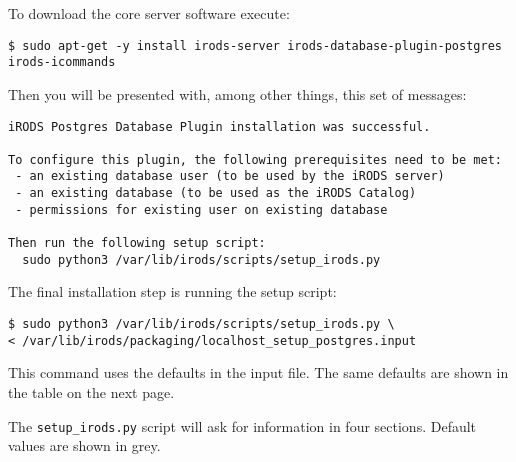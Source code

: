 \documentclass[10pt,oneside]{memoir}
\begin{document}
To download the core server software execute:

\begin{lstlisting}
$ sudo apt-get -y install irods-server irods-database-plugin-postgres irods-icommands
\end{lstlisting}

Then you will be presented with, among other things, this set of messages:

\begin{lstlisting}
iRODS Postgres Database Plugin installation was successful.

To configure this plugin, the following prerequisites need to be met:
 - an existing database user (to be used by the iRODS server)
 - an existing database (to be used as the iRODS Catalog)
 - permissions for existing user on existing database

Then run the following setup script:
  sudo python3 /var/lib/irods/scripts/setup_irods.py
\end{lstlisting}

The final installation step is running the setup script:

\begin{lstlisting}
$ sudo python3 /var/lib/irods/scripts/setup_irods.py \
< /var/lib/irods/packaging/localhost_setup_postgres.input
\end{lstlisting}

This command uses the defaults in the input file.  The same defaults are shown in the table on the next page.

\newpage
The \texttt{setup\_irods.py} script will ask for information in four sections.  Default values are shown in grey.
\end{document}
